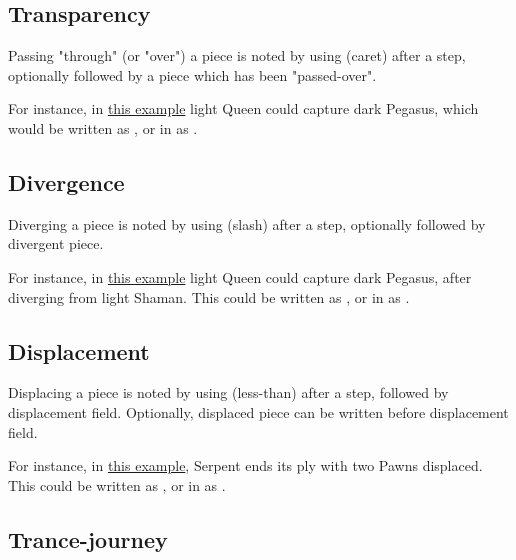 \subsection*{Transparency}
\label{sec:Appendix/Notation/Transparency}

Passing "through" (or "over") a piece is noted by using \alg{\^{}} (caret) after a step,
optionally followed by a piece which has been "passed-over".

For instance, in \hyperref[fig:scn_mv_07_wave_is_transparent]{this example} light Queen
could capture dark Pegasus, which would be written as \newline
{}, or in  as \newline
{}.

\subsection*{Divergence}
\label{sec:Appendix/Notation/Divergence}

Diverging a piece is noted by using \alg{/} (slash) after a step, optionally followed
by divergent piece.

For instance, in \hyperref[fig:scn_cot_09_own_shaman_is_divergent_init]{this example}
light Queen could capture dark Pegasus, after diverging from light Shaman.
This could be written as , or in  as .

\subsection*{Displacement}
\label{sec:Appendix/Notation/Displacement}

Displacing a piece is noted by using \alg{<} (less-than) after a step, followed by
displacement field. Optionally, displaced piece can be written before displacement
field.

For instance, in \hyperref[fig:scn_tr_19_displacement_init]{this example}, Serpent ends
its ply with two Pawns displaced. This could be written as ,
or in  as \newline
{}.

\subsection*{Trance-journey}
\label{sec:Appendix/Notation/Trance-journey}

